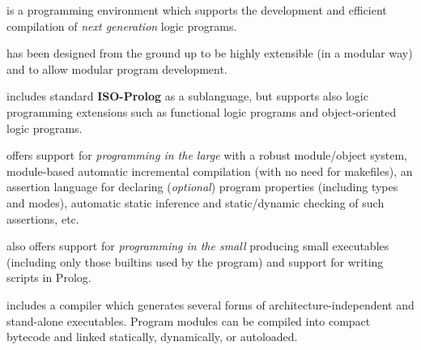 \documentclass{article}
\newcommand{\inbf}[1]{{\bf #1}}
\newcommand{\enfat}[1]{{\em #1}}
\newcommand{\ciao}{\psfig{figure=ciao_s.ps}}
\begin{document}
\pagestyle{empty}


\twocolumn[
\ \rule{\textwidth}{.04 in}\\
\hspace*{0.04\textwidth}
\hbox{
      \vbox{\vspace{12pt}\hbox{\engcliplogo}}
      \hspace*{+0.25\textwidth}
      \vbox{\ciao}
}\\
\ \rule{\textwidth}{.04 in}\\ %

\begin{center}
\begin{LARGE}
\underline{{\bf Ciao Prolog 1.4 is now available}}\\ %
\end{LARGE}
\begin{Large}
{\tt ciao@clip.dia.fi.upm.es}\\
{\tt http://www.clip.dia.fi.upm.es/Software/Ciao}\\ %
\end{Large}
\end{center}
]


 is a  programming environment which
supports the development and efficient compilation of \enfat{next
  generation} logic programs.

 has been designed from the ground up to be highly extensible (in a
 modular way) and to allow modular program development.

 includes standard \inbf{ISO-Prolog} as a sublanguage, but supports
also logic programming extensions such as 
functional logic programs and object-oriented logic programs. 

 offers support for \enfat{programming in the large} with
      a robust module/object system, module-based automatic
      incremental compilation (with no need for makefiles), an
      assertion language for declaring (\enfat{optional}) program
      properties (including types and modes), automatic static
      inference and static/dynamic checking of such assertions, etc.

 also offers support for \enfat{programming in the small}
      producing small executables (including only those builtins used
      by the program) and support for writing scripts in Prolog.

 includes a compiler which generates several forms of
      architecture-independent and stand-alone executables.  Program
      modules can be compiled into compact bytecode 
      and linked statically, dynamically, or autoloaded.
\end{document}
